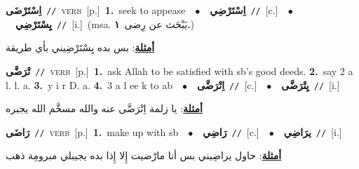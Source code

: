 \documentclass[10pt,a4paper,twoside]{article} %
\begin{document}
\begin{multicols}{2}
{\setlength\topsep{0pt}\textbf{\foreignlanguage{arabic}{اِسْتَرْضَى}}\ {\color{gray}\texttt{//}\color{black}}\ \textsc{verb}\ [p.]\ \textbf{1.}~seek to appease\ \ $\bullet$\ \ \setlength\topsep{0pt}\textbf{\foreignlanguage{arabic}{اِسْتَرْضِي}}\ {\color{gray}\texttt{//}\color{black}}\ [c.]\ \ $\bullet$\ \ \setlength\topsep{0pt}\textbf{\foreignlanguage{arabic}{يِسْتَرْضِي}}\ {\color{gray}\texttt{//}\color{black}}\ [i.]\ \color{gray}(msa. \foreignlanguage{arabic}{يَبْحَث عن رِضى}~\foreignlanguage{arabic}{\textbf{١.}})\color{black}\  \begin{flushright}\color{gray}\foreignlanguage{arabic}{\textbf{\underline{\foreignlanguage{arabic}{أمثلة}}}: بس بده يِسْتَرْضِيني بأي طريقة}\end{flushright}\color{black}} \vspace{2mm}

{\setlength\topsep{0pt}\textbf{\foreignlanguage{arabic}{تْرَضَّى}}\ {\color{gray}\texttt{//}\color{black}}\ \textsc{verb}\ [p.]\ \textbf{1.}~ask Allah to be satisfied with sb's good deeds.  \textbf{2.}~say 2 a l. l. a.  \textbf{3.}~y i r D. a.  \textbf{4.}~3 a l ee k to ab\ \ $\bullet$\ \ \setlength\topsep{0pt}\textbf{\foreignlanguage{arabic}{اِتْرَضَّى}}\ {\color{gray}\texttt{//}\color{black}}\ [c.]\ \ $\bullet$\ \ \setlength\topsep{0pt}\textbf{\foreignlanguage{arabic}{يِتْرَضَّى}}\ {\color{gray}\texttt{//}\color{black}}\ [i.]\  \begin{flushright}\color{gray}\foreignlanguage{arabic}{\textbf{\underline{\foreignlanguage{arabic}{أمثلة}}}: يا زلمة اِتْرَضَّى عنه والله مسخَّم الله يجبره}\end{flushright}\color{black}} \vspace{2mm}

{\setlength\topsep{0pt}\textbf{\foreignlanguage{arabic}{رَاضَى}}\ {\color{gray}\texttt{//}\color{black}}\ \textsc{verb}\ [p.]\ \textbf{1.}~make up with sb\ \ $\bullet$\ \ \setlength\topsep{0pt}\textbf{\foreignlanguage{arabic}{رَاضِي}}\ {\color{gray}\texttt{//}\color{black}}\ [c.]\ \ $\bullet$\ \ \setlength\topsep{0pt}\textbf{\foreignlanguage{arabic}{يرَاضِي}}\ {\color{gray}\texttt{//}\color{black}}\ [i.]\  \begin{flushright}\color{gray}\foreignlanguage{arabic}{\textbf{\underline{\foreignlanguage{arabic}{أمثلة}}}: حاول يراضِيني بس أنا مارْضيت إِلا إِذا بده يجيبلي مبرومِة ذهب}\end{flushright}\color{black}} \vspace{2mm}


\end{multicols}
\end{document}
